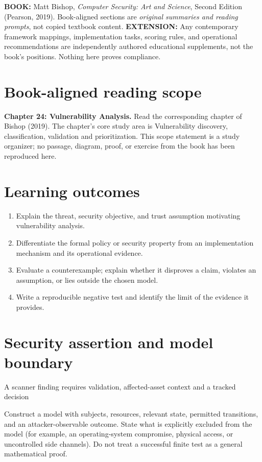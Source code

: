 \documentclass[10pt,letterpaper]{article}
\begin{document}
\makedoctocpage
\begin{notebox}
\textbf{BOOK:} Matt Bishop, \emph{Computer Security: Art and Science}, Second Edition (Pearson, 2019). Book-aligned sections are \emph{original summaries and reading prompts}, not copied textbook content.
\textbf{EXTENSION:} Any contemporary framework mappings, implementation tasks, scoring rules, and operational recommendations are independently authored educational supplements, not the book's positions. Nothing here proves compliance.
\end{notebox}
\section{Book-aligned reading scope}
\textbf{Chapter 24: Vulnerability Analysis.} Read the corresponding chapter of Bishop (2019). The chapter's core study area is Vulnerability discovery, classification, validation and prioritization. This scope statement is a study organizer; no passage, diagram, proof, or exercise from the book has been reproduced here.
\section{Learning outcomes}
\begin{enumerate}
\item Explain the threat, security objective, and trust assumption motivating vulnerability analysis.
\item Differentiate the formal policy or security property from an implementation mechanism and its operational evidence.
\item Evaluate a counterexample; explain whether it disproves a claim, violates an assumption, or lies outside the chosen model.
\item Write a reproducible negative test and identify the limit of the evidence it provides.
\end{enumerate}
\section{Security assertion and model boundary}
\begin{infobox}
A scanner finding requires validation, affected-asset context and a tracked decision
\end{infobox}
Construct a model with subjects, resources, relevant state, permitted transitions, and an attacker-observable outcome. State what is explicitly excluded from the model (for example, an operating-system compromise, physical access, or uncontrolled side channels). Do not treat a successful finite test as a general mathematical proof.
\end{document}
